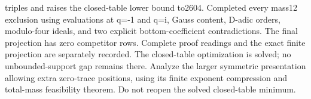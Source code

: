 triples and raises the closed-table lower bound to2604. Completed every mass12 exclusion using evaluations at q=-1 and q=i, Gauss content, D-adic orders, modulo-four ideals, and two explicit bottom-coefficient contradictions. The final projection has zero competitor rows. Complete proof readings and the exact finite projection are separately recorded. The closed-table optimization is solved; no unbounded-support gap remains there. Analyze the larger symmetric presentation allowing extra zero-trace positions, using its finite exponent compression and total-mass feasibility theorem. Do not reopen the solved closed-table minimum.
